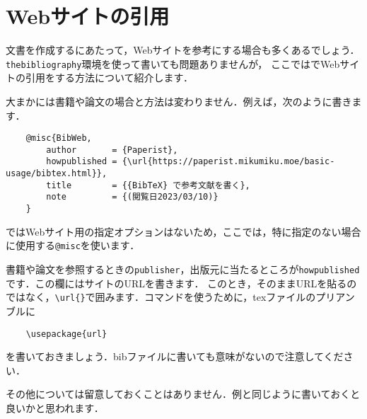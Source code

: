 \documentclass[a4paper,11pt]{jsreport}
\numberwithin{equation}{section}
\theoremstyle{definition}
\begin{document}
\section{Webサイトの引用}

文書を作成するにあたって，Webサイトを参考にする場合も多くあるでしょう．\verb|thebibliography|環境を使って書いても問題ありませんが，
ここでは{\BibTeX}でWebサイトの引用をする方法について紹介します．

大まかには書籍や論文の場合と方法は変わりません．例えば，次のように書きます\cite{BibWeb}．
\begin{verbatim}
    @misc{BibWeb,
        author       = {Paperist},
        howpublished = {\url{https://paperist.mikumiku.moe/basic-usage/bibtex.html}},
        title        = {{BibTeX} で参考文献を書く},
        note         = {(閲覧日2023/03/10)}
    }
\end{verbatim}

{\BibTeX}ではWebサイト用の指定オプションはないため，ここでは，特に指定のない場合に使用する\verb|@misc|を使います．

書籍や論文を参照するときの\verb|publisher|，出版元に当たるところが\verb|howpublished|です．この欄にはサイトのURLを書きます．
このとき，そのままURLを貼るのではなく，\verb|\url{}|で囲みます．コマンドを使うために，texファイルのプリアンブルに
\begin{verbatim}
    \usepackage{url}
\end{verbatim}
を書いておきましょう．bibファイルに書いても意味がないので注意してください．

その他については留意しておくことはありません．例と同じように書いておくと良いかと思われます．



\end{document}
